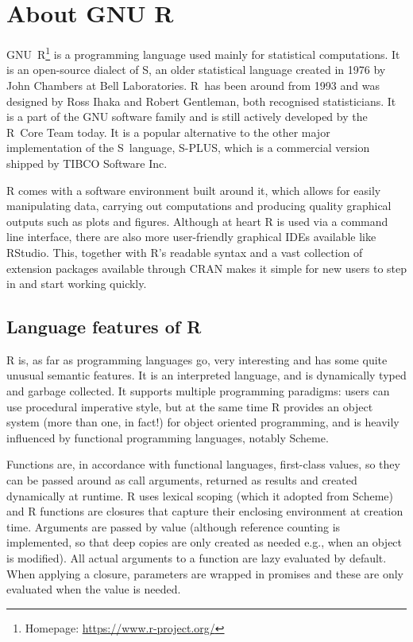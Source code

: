 \chapter{About GNU R}

GNU~R\footnote{Homepage: \url{https://www.r-project.org/}} is a programming language used mainly for statistical computations. It is an open-source dialect of S, an older statistical language created in 1976 by John Chambers at Bell Laboratories. R~has been around from 1993 and was designed by Ross Ihaka and Robert Gentleman, both recognised statisticians. It is a part of the GNU software family and is still actively developed by the R~Core Team today. It is a popular alternative to the other major implementation of the S~language, S-PLUS, which is a commercial version shipped by TIBCO Software Inc.
\todo[cite]

R comes with a software environment built around it, which allows for easily manipulating data, carrying out computations and producing quality graphical outputs such as plots and figures. Although at heart R is used via a command line interface, there are also more user-friendly graphical IDEs available like RStudio. This, together with R's readable syntax and a vast collection of extension packages available through CRAN makes it simple for new users to step in and start working quickly.


\section{Language features of R}



R is, as far as programming languages go, very interesting and has some quite unusual semantic features. It is an interpreted language, and is dynamically typed and garbage collected. It supports multiple programming paradigms: users can use procedural imperative style, but at the same time R provides an object system (more than one, in fact!) for object oriented programming, and is heavily influenced by functional programming languages, notably Scheme.

Functions are, in accordance with functional languages, first-class values, so they can be passed around as call arguments, returned as results and created dynamically at runtime. R uses lexical scoping (which it adopted from Scheme) and R functions are closures that capture their enclosing environment at creation time. Arguments are passed by value (although reference counting is implemented, so that deep copies are only created as needed e.g., when an object is modified). All actual arguments to a function are lazy evaluated by default. When applying a closure, parameters are wrapped in promises and these are only evaluated when the value is needed.

